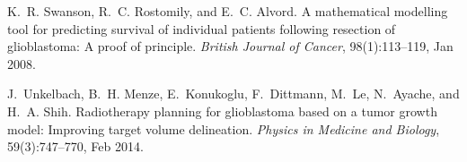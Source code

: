 \begin{DoxyDescription}
\item[\label{citelist_CITEREF_swanson_2008}%
\Hypertarget{citelist_CITEREF_swanson_2008}%
\mbox{[}7\mbox{]}]K.~R. Swanson, R.~C. Rostomily, and E.~C. Alvord. A mathematical modelling tool for predicting survival of individual patients following resection of glioblastoma\+: A proof of principle. {\itshape British Journal of Cancer}, 98(1)\+:113--119, Jan 2008.


\item[\label{citelist_CITEREF_unkelbach_2014}%
\Hypertarget{citelist_CITEREF_unkelbach_2014}%
\mbox{[}8\mbox{]}]J.~Unkelbach, B.~H. Menze, E.~Konukoglu, F.~Dittmann, M.~Le, N.~Ayache, and H.~A. Shih. Radiotherapy planning for glioblastoma based on a tumor growth model\+: Improving target volume delineation. {\itshape Physics in Medicine and Biology}, 59(3)\+:747--770, Feb 2014.


\end{DoxyDescription}